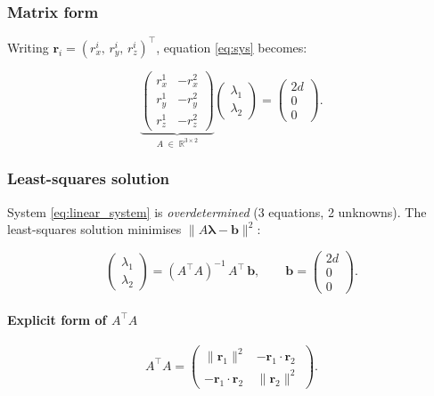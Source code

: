 \documentclass[12pt, a4paper]{article}
\begin{document}
\subsubsection{Matrix form}
Writing $\mathbf{r}_i = (r_x^i,\, r_y^i,\, r_z^i)^\top$, equation
\eqref{eq:sys} becomes:

\begin{equation}
\underbrace{
\begin{pmatrix}
r_x^1 & -r_x^2 \\
r_y^1 & -r_y^2 \\
r_z^1 & -r_z^2
\end{pmatrix}
}_{A\;\in\;\mathbb{R}^{3\times 2}}
\begin{pmatrix} \lambda_1 \\ \lambda_2 \end{pmatrix}
=
\begin{pmatrix} 2d \\ 0 \\ 0 \end{pmatrix}.
\label{eq:linear_system}
\end{equation}

\subsubsection{Least-squares solution}
System \eqref{eq:linear_system} is \emph{overdetermined} (3 equations,
2 unknowns). The least-squares solution minimises
$\|A\boldsymbol{\lambda} - \mathbf{b}\|^2$:

\begin{equation}
\begin{pmatrix} \lambda_1 \\ \lambda_2 \end{pmatrix}
= (A^\top A)^{-1}\,A^\top\,\mathbf{b},
\qquad \mathbf{b} = \begin{pmatrix} 2d \\ 0 \\ 0 \end{pmatrix}.
\label{eq:lstsq}
\end{equation}

\paragraph{Explicit form of $A^\top A$}
\begin{equation}
A^\top A =
\begin{pmatrix}
\|\mathbf{r}_1\|^2 & -\mathbf{r}_1\cdot\mathbf{r}_2 \\
-\mathbf{r}_1\cdot\mathbf{r}_2 & \|\mathbf{r}_2\|^2
\end{pmatrix}.
\end{equation}
\end{document}
